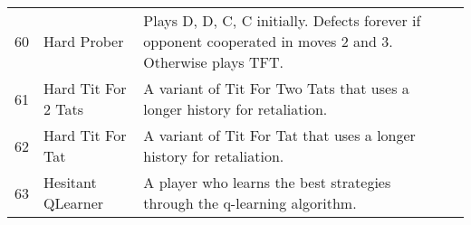\begin{table}[H]
\begin{adjustbox}{height=0.8\textwidth, width=1.1\textwidth}
\begin{tabular}{rlll}
	60   & Hard Prober                 & Plays D, D, C, C initially. Defects forever if opponent cooperated in moves
	2 and 3. Otherwise plays TFT.                                                                                                                                                                                                                                                                                                                                                                                                                                                                                                                                                                                                                                                                                                                                                                                                                                                                                                            \\
	61   & Hard Tit For 2 Tats         & A variant of Tit For Two Tats that uses a longer history for
	retaliation.                                                                                                                                                                                                                                                                                                                                                                                                                                                                                                                                                                                                                                                                                                                                                                                                                                                                                                                                            \\
	62   & Hard Tit For Tat            & A variant of Tit For Tat that uses a longer history for retaliation.                                                              \\
	63   & Hesitant QLearner           & A player who learns the best strategies through the q-learning algorithm.


\end{tabular}
\end{adjustbox}
\end{table}
